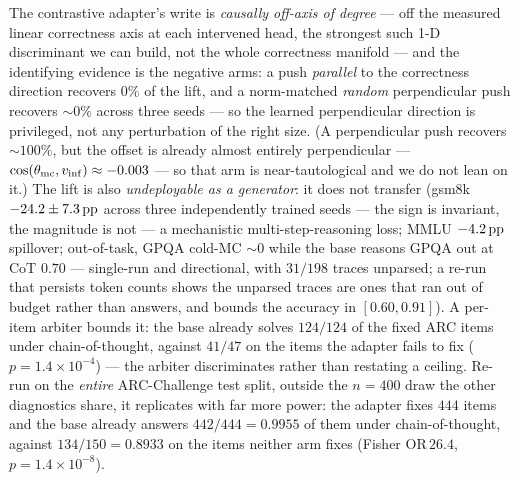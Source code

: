 The contrastive adapter's write is \emph{causally off-axis of degree} --- off the
measured linear
correctness axis at each intervened head, the strongest such 1-D discriminant we can
build, not the whole correctness manifold --- and the identifying evidence is
the negative arms: a push \emph{parallel} to the correctness direction recovers
$0\%$ of the lift, and a norm-matched \emph{random} perpendicular push recovers
${\sim}0\%$ across three seeds --- so the learned perpendicular direction is
privileged, not any perturbation of the right size. (A perpendicular push recovers
${\sim}100\%$, but the offset is already almost entirely perpendicular ---
$\cos(\theta_{\mathrm{mc}}, v_{\mathrm{inf}}) \approx -0.003$ --- so that arm is near-tautological and we
do not lean on it.) The lift is also \emph{undeployable as a generator}: it does not
transfer (gsm8k $-24.2 \pm 7.3\,\mathrm{pp}$ across three independently trained seeds --- the
sign is invariant, the magnitude is not --- a mechanistic multi-step-reasoning loss;
MMLU $-4.2\,\mathrm{pp}$ spillover; out-of-task, GPQA cold-MC ${\sim}0$ while the base reasons
GPQA out at CoT $0.70$ --- single-run and directional, with $31/198$ traces unparsed; a
re-run that persists token counts shows the unparsed traces are ones that ran out of
budget rather than answers, and bounds the accuracy in $[0.60, 0.91]$). A per-item arbiter bounds it: the base
already solves $124/124$ of the fixed ARC items under chain-of-thought, against
$41/47$ on the items the adapter fails to fix ($p=1.4\times10^{-4}$) --- the arbiter
discriminates rather than restating a ceiling. Re-run on the \emph{entire}
ARC-Challenge test split, outside the $n{=}400$ draw the other diagnostics share, it
replicates with far more power: the adapter fixes $444$ items and the base already
answers $442/444 = 0.9955$ of them under chain-of-thought, against $134/150 = 0.8933$
on the items neither arm fixes (Fisher $\mathrm{OR}\,26.4$,
$p=1.4\times10^{-8}$).

